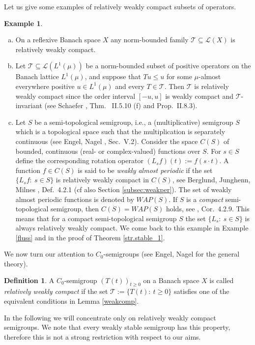\documentclass[11pt,intlimits, draft,oneside]{amsart}
\theoremstyle{definition}
\newtheorem{defi}[thm]{Definition}
\newtheorem{example}[thm]{Example}
\def\LLL{\mathcal{L}}
\begin{document}
\noindent Let us give some examples of relatively weakly compact
subsets of operators.
\begin{example}\label{ex:relcomp} \rule{0pt}{0pt}
\begin{enumerate}[(a)]
\item On a reflexive Banach space $X$ any norm-bounded family $\mathcal{T}\subseteq \LLL(X)$ is relatively weakly compact.
\item Let $\mathcal{T}\subseteq \LLL(L^1(\mu))$ be a norm-bounded subset of positive operators on the Banach lattice $L^1(\mu)$, and suppose that $Tu\leq u$ for some $\mu$-almost everywhere positive $u\in L^1(\mu)$ and every $T\in \mathcal{T}$. Then $\mathcal{T}$ is relatively
weakly compact since the order interval $[-u,u]$ is weakly compact
and $\mathcal{T}$-invariant (see Schaefer \cite{schaefer:1974},
Thm.~ II.5.10 (f) and Prop.~II.8.3).
\item \label{ex:semitop} Let $S$ be a semi-topological semigroup, i.e., a (multiplicative) semigroup $S$ which is a
topological space such that the multiplication is separately
continuous (see Engel, Nagel \cite{engel/nagel:2000}, Sec.~V.2).
Consider the space $C(S)$ of bounded, continuous (real- or
complex-valued) functions over $S$.  For $s\in S$ define the
corresponding rotation operator $(L_s f)(t):= f(s\cdot t)$. A
function $f\in C(S)$ is said to be \emph{weakly almost periodic} if
the set $\{L_s f:\: s\in S\}$ is relatively weakly compact in
$C(S)$, see Berglund, Junghenn, Milnes \cite{berglund/etal:1989},
Def.~4.2.1 (cf also Section \ref{subsec:weakper}). The set of weakly
almost periodic functions is denoted by $WAP(S)$. If $S$ is a
\emph{compact} semi-topological semigroup, then $C(S)=WAP(S)$ holds,
see \cite{berglund/etal:1989}, Cor.~4.2.9. This means that for a
compact semi-topological semigroup $S$ the set $\{L_s:\:s\in S\}$ is
always relatively weakly compact. We come back to this example in
Example \ref{fluss} and in the proof of Theorem \ref{str.stable_1}.
\end{enumerate}
\end{example}
\noindent We now turn our attention to $C_0$-semigroups (see Engel,
Nagel \cite{engel/nagel:2000} for the general theory).


\begin{defi} A $C_0$-semigroup $(T(t))_{t\geq 0}$ on a Banach space $X$ is called \emph{relatively weakly
compact} if the set $\mathcal{T}:=\{T(t):\: t\geq 0\}$ satisfies one
of the equivalent conditions in Lemma \ref{weakcomp}.
\end{defi}
%
In the following we will concentrate only on relatively weakly
compact semigroups. We note that every weakly stable semigroup
has this property, therefore this is not a strong restriction
with respect to our aims.
\end{document}
